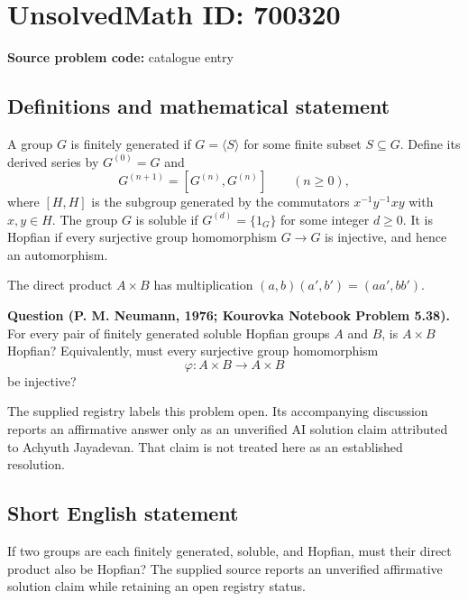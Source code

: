 \documentclass[11pt]{article}
\begin{document}
\section*{UnsolvedMath ID: 700320}
\textbf{Source problem code:} catalogue entry
\subsection{Definitions and mathematical statement}
A group \(G\) is finitely generated if \(G=\langle S\rangle\) for some finite subset \(S\subseteq G\). Define its derived series by \(G^{(0)}=G\) and
\[
G^{(n+1)}=[G^{(n)},G^{(n)}]\qquad(n\geq 0),
\]
where \([H,H]\) is the subgroup generated by the commutators \(x^{-1}y^{-1}xy\) with \(x,y\in H\). The group \(G\) is soluble if \(G^{(d)}=\{1_G\}\) for some integer \(d\geq 0\). It is Hopfian if every surjective group homomorphism \(G\to G\) is injective, and hence an automorphism.

The direct product \(A\times B\) has multiplication \((a,b)(a',b')=(aa',bb')\).

\textbf{Question (P. M. Neumann, 1976; Kourovka Notebook Problem 5.38).} For every pair of finitely generated soluble Hopfian groups \(A\) and \(B\), is \(A\times B\) Hopfian? Equivalently, must every surjective group homomorphism
\[
\varphi:A\times B\longrightarrow A\times B
\]
be injective?

The supplied registry labels this problem open. Its accompanying discussion reports an affirmative answer only as an unverified AI solution claim attributed to Achyuth Jayadevan. That claim is not treated here as an established resolution.
\subsection{Short English statement}
If two groups are each finitely generated, soluble, and Hopfian, must their direct product also be Hopfian? The supplied source reports an unverified affirmative solution claim while retaining an open registry status.
\end{document}
